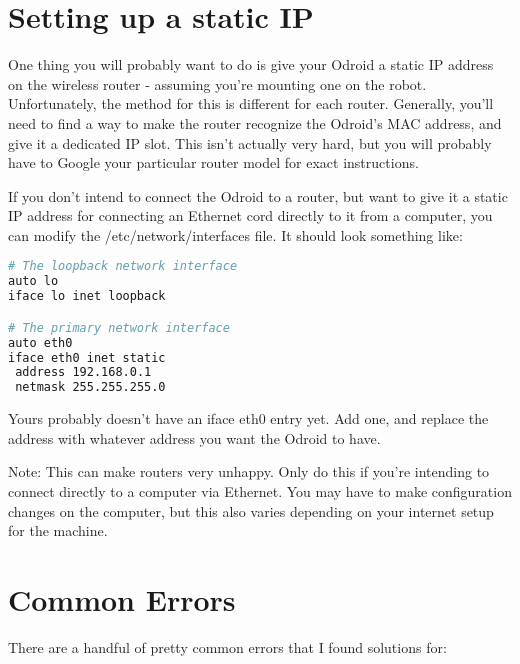 \section{Setting up a static IP}

One thing you will probably want to do is give your Odroid a static IP address on the wireless router - assuming you're mounting one on the robot. Unfortunately, the method for this is different for each router. Generally, you'll need to find a way to make the router recognize the Odroid's MAC address, and give it a dedicated IP slot. This isn't actually very hard, but you will probably have to Google your particular router model for exact instructions.

If you don't intend to connect the Odroid to a router, but want to give it a static IP address for connecting an Ethernet cord directly to it from a computer, you can modify the /etc/network/interfaces file. It should look something like: 

\begin{lstlisting}[language=bash,breaklines=true]
# The loopback network interface
auto lo
iface lo inet loopback

# The primary network interface
auto eth0
iface eth0 inet static
 address 192.168.0.1
 netmask 255.255.255.0
\end{lstlisting}

Yours probably doesn't have an iface eth0 entry yet. Add one, and replace the address with whatever address you want the Odroid to have.

Note: This can make routers very unhappy. Only do this if you're intending to connect directly to a computer via Ethernet. You may have to make configuration changes on the computer, but this also varies depending on your internet setup for the machine.


\section{Common Errors}

There are a handful of pretty common errors that I found solutions for:

